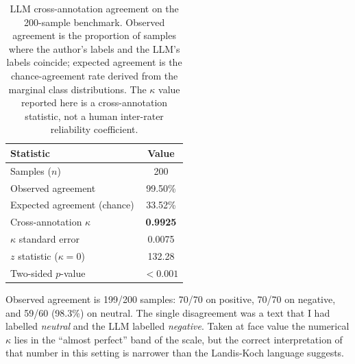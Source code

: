 \begin{table}[H]
  \centering
  \caption{LLM cross-annotation agreement on the 200-sample benchmark. Observed agreement is the proportion of samples where the author's labels and the LLM's labels coincide; expected agreement is the chance-agreement rate derived from the marginal class distributions. The $\kappa$ value reported here is a cross-annotation statistic, not a human inter-rater reliability coefficient.}
  \label{tab:kappa}
  \begin{tabular}{@{}lc@{}}
    \toprule
    \textbf{Statistic} & \textbf{Value} \\
    \midrule
    Samples ($n$)                       & 200 \\
    Observed agreement                  & 99.50\% \\
    Expected agreement (chance)         & 33.52\% \\
    Cross-annotation $\kappa$           & \textbf{0.9925} \\
    $\kappa$ standard error             & 0.0075 \\
    $z$ statistic ($\kappa = 0$)        & 132.28 \\
    Two-sided $p$-value                 & $<0.001$ \\
    \bottomrule
  \end{tabular}
\end{table}

Observed agreement is 199/200 samples: 70/70 on positive, 70/70 on negative, and 59/60 (98.3\%) on neutral. The single disagreement was a text that I had labelled \textit{neutral} and the LLM labelled \textit{negative}. Taken at face value the numerical $\kappa$ lies in the ``almost perfect'' band of the \citet{landis1977measurement} scale, but the correct interpretation of that number in this setting is narrower than the Landis-Koch language suggests.

